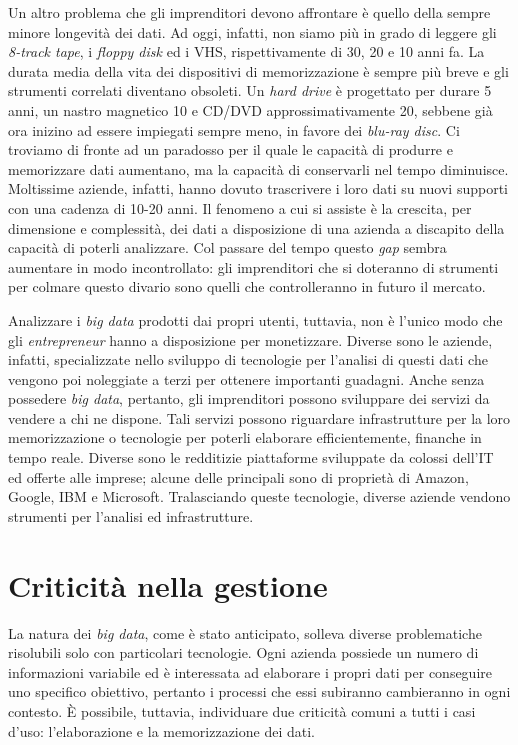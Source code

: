 Un altro problema che gli imprenditori devono affrontare è quello della sempre minore longevità dei dati. Ad oggi, infatti, non siamo più in grado di leggere gli \textit{8-track tape}, 
i \textit{floppy disk} ed i VHS, rispettivamente di 30, 20 e 10 anni fa. La durata media della vita dei dispositivi di memorizzazione è sempre più breve e gli strumenti correlati diventano 
obsoleti. Un \textit{hard drive} è progettato per durare 5 anni, un nastro magnetico 10 e CD/DVD approssimativamente 20, sebbene già ora inizino ad essere impiegati sempre meno, in favore 
dei \textit{blu-ray disc}. Ci troviamo di fronte ad un paradosso per il quale le capacità di produrre e memorizzare dati aumentano, ma la capacità di conservarli nel tempo diminuisce. 
Moltissime aziende, infatti, hanno dovuto trascrivere i loro dati su nuovi supporti con una cadenza di 10-20 anni. Il fenomeno a cui si assiste è la crescita, per dimensione e 
complessità, dei dati a disposizione di una azienda a discapito della capacità di poterli analizzare. Col passare del tempo questo \textit{gap} sembra aumentare in modo incontrollato: 
gli imprenditori che si doteranno di strumenti per colmare questo divario sono quelli che controlleranno in futuro il mercato.

Analizzare i \textit{big data} prodotti dai propri utenti, tuttavia, non è l’unico modo che gli \textit{entrepreneur} hanno a disposizione per monetizzare. Diverse sono le aziende, infatti, 
specializzate nello sviluppo di tecnologie per l’analisi di questi dati che vengono poi noleggiate a terzi per ottenere importanti guadagni. Anche senza possedere \textit{big data}, 
pertanto, gli imprenditori possono sviluppare dei servizi da vendere a chi ne dispone. Tali servizi possono riguardare infrastrutture per la loro memorizzazione o tecnologie 
per poterli elaborare efficientemente, finanche in tempo reale. Diverse sono le redditizie piattaforme sviluppate da colossi dell’IT ed offerte alle imprese; alcune delle 
principali sono di proprietà di Amazon, Google, IBM e Microsoft. Tralasciando queste tecnologie, diverse aziende vendono strumenti per l’analisi ed infrastrutture.


\section{Criticità nella gestione}
\label{par:crit}

La natura dei \textit{big data}, come è stato anticipato, solleva diverse problematiche risolubili solo con particolari tecnologie. Ogni azienda possiede un numero di informazioni 
variabile ed è interessata ad elaborare i propri dati per conseguire uno specifico obiettivo, pertanto i processi che essi subiranno cambieranno in ogni contesto. È possibile, 
tuttavia, individuare due criticità comuni a tutti i casi d’uso: l’elaborazione e la memorizzazione dei dati.

